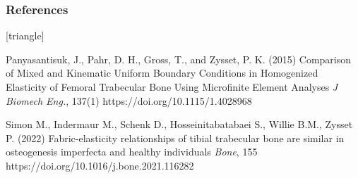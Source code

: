 \documentclass[xcolor=table,11pt]{beamer}
\begin{document}
	\begin{frame}
		\frametitle{References}
		\footnotesize{
				\begin{thebibliography}{99}
						[triangle]
						
						 Panyasantisuk, J., Pahr, D. H., Gross, T., and Zysset, P. K. (2015)
						\newblock Comparison of Mixed and Kinematic Uniform Boundary Conditions in Homogenized Elasticity of Femoral Trabecular Bone Using Microfinite Element Analyses
						\newblock \textit{J Biomech Eng.}, 137(1)
						\newblock https://doi.org/10.1115/1.4028968

						Simon M., Indermaur M., Schenk D., Hosseinitabatabaei S., Willie B.M., Zysset P. (2022)
						\newblock Fabric-elasticity relationships of tibial trabecular bone are similar in osteogenesis imperfecta and healthy individuals
						\newblock \textit{Bone}, 155
						\newblock https://doi.org/10.1016/j.bone.2021.116282
						
					\end{thebibliography}
			}
	\end{frame}
	
\end{document}
